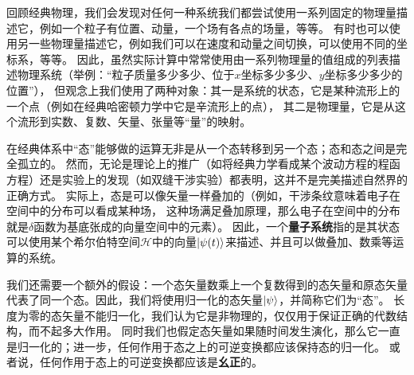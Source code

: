 \documentclass[UTF8, a4paper]{ctexart}
\begin{document}
回顾经典物理，我们会发现对任何一种系统我们都尝试使用一系列固定的物理量描述它，例如一个粒子有位置、动量，一个场有各点的场量，等等。
有时也可以使用另一些物理量描述它，例如我们可以在速度和动量之间切换，可以使用不同的坐标系，等等。
因此，虽然实际计算中常常使用由一系列物理量的值组成的列表描述物理系统（举例：“粒子质量多少多少、位于$x$坐标多少多少、$y$坐标多少多少的位置”），
但观念上我们使用了两种对象：其一是系统的状态，它是某种流形上的一个点（例如在经典哈密顿力学中它是辛流形上的点），
其二是物理量，它是从这个流形到实数、复数、矢量、张量等“量”的映射。

在经典体系中“态”能够做的运算无非是从一个态转移到另一个态；态和态之间是完全孤立的。
然而，无论是理论上的推广（如将经典力学看成某个波动方程的程函方程）还是实验上的发现（如双缝干涉实验）都表明，这并不是完美描述自然界的正确方式。
实际上，态是可以像矢量一样叠加的（例如，干涉条纹意味着电子在空间中的分布可以看成某种场，
这种场满足叠加原理，那么电子在空间中的分布就是$\delta$函数为基底张成的向量空间中的元素）。
因此，一个\textbf{量子系统}指的是其状态可以使用某个希尔伯特空间$\mathcal{H}$中的向量$\ket{\psi(t)}$来描述、并且可以做叠加、数乘等运算的系统。

我们还需要一个额外的假设：一个态矢量数乘上一个复数得到的态矢量和原态矢量代表了同一个态。因此，我们将使用归一化的态矢量$\ket{\psi}$，并简称它们为“态”。
长度为零的态矢量不能归一化，我们认为它是非物理的，仅仅用于保证正确的代数结构，而不起多大作用。
同时我们也假定态矢量如果随时间发生演化，那么它一直是归一化的；进一步，任何作用于态之上的可逆变换都应该保持态的归一化。
或者说，任何作用于态上的可逆变换都应该是\textbf{幺正}的。
\end{document}
